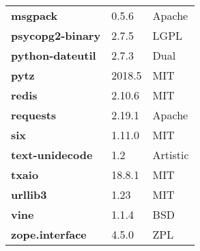 \begin{longtable}{| p{} | p{} | p{} |}
\textbf{msgpack} & 0.5.6 & Apache \\
\textbf{psycopg2-binary} & 2.7.5 & LGPL \\
\textbf{python-dateutil} & 2.7.3 & Dual \\
\textbf{pytz} & 2018.5 & MIT \\
\textbf{redis} & 2.10.6 & MIT \\
\textbf{requests} & 2.19.1 & Apache \\
\textbf{six} & 1.11.0 & MIT \\
\textbf{text-unidecode} & 1.2 & Artistic \\
\textbf{txaio} & 18.8.1 & MIT \\
\textbf{urllib3} & 1.23 & MIT \\
\textbf{vine} & 1.1.4 & BSD \\
\textbf{zope.interface} & 4.5.0 & ZPL \\
\hline
\end{longtable}
